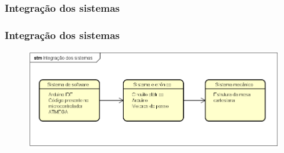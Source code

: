 \subsubsection{Integração dos sistemas}

\begin{frame}
\frametitle{Integração dos sistemas}

\begin{figure}
\centering
\includegraphics[scale = 0.4]{figuras/integracao}
\end{figure}

\end{frame}
